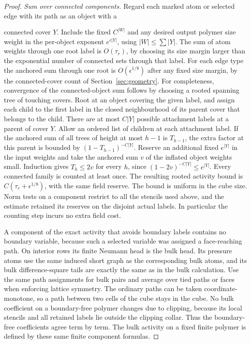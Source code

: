 \documentclass[11pt]{article}
\theoremstyle{definition}
\begin{document}
\begin{proof}
\emph{Sum over connected components.}
Regard each marked atom or selected edge with its path as an
object with a

connected cover \(Y\). Include the fixed \(C^{|W|}\) and any
desired output polymer size weight in the per-object exponent
\(e^{c|Y|}\), using \(|W|\le\sum |Y|\). The sum of atom
weights through one root label is \(O(\tau_r)\), by choosing
its size margin larger than the exponential number of
connected sets through that label. For each edge type the
anchored sum through one root is \(O(\epsilon^{1/8})\) after
any fixed size margin, by the connected-cover count of
Section~\ref{sec:geometry}. For completeness, convergence of
the connected-object sum follows by choosing a rooted spanning
tree of touching covers. Root at an object covering the given
label, and assign each child to the first label in the closed
neighbourhood of its parent cover that belongs to the child.
There are at most \(C|Y|\) possible attachment labels at a
parent of cover \(Y\). Allow an ordered list of children at
each attachment label. If the anchored sum of all trees of
height at most \(h-1\) is \(T_{h-1}\), the extra factor at
this parent is bounded by \((1-T_{h-1})^{-C|Y|}\).
Reserve an additional fixed \(e^{|Y|}\) in the input
weights and take the anchored sum \(v\) of the inflated object
weights small. Induction gives \(T_h\le 2v\) for every \(h\),
since \((1-2v)^{-C|Y|}\le e^{|Y|}\). Every connected family
is counted at least once. The resulting rooted activity bound
is \(C(\tau_r+\epsilon^{1/8})\), with the same field reserve.
The bound is uniform in the cube size. Norm tests on a
component restrict to all the stencils used above, and the
estimate retained its reserves on the disjoint actual labels.
In particular the counting step incurs no extra field cost.

A component of the exact activity that avoids boundary labels
contains no boundary variable, because such a selected
variable was assigned a face-reaching path. On interior rows
its finite Neumann head is the bulk head. Its pressure atoms
use the same induced short graph as the corresponding bulk
atoms, and its bulk difference-square tails are exactly the
same as in the bulk calculation. Use the same path assignments
for bulk pairs and average over tied paths or faces when
enforcing lattice symmetry. The ordinary paths can be taken
coordinate-monotone, so a path between two cells of the cube
stays in the cube. No bulk coefficient on a boundary-free
polymer changes due to clipping, because its local stencils
and all retained labels lie outside the clipping collar.
Thus the boundary-free coefficients agree term by term.
The bulk activity on a fixed finite polymer is defined by
these same finite component formulas.


\end{proof}
\end{document}
